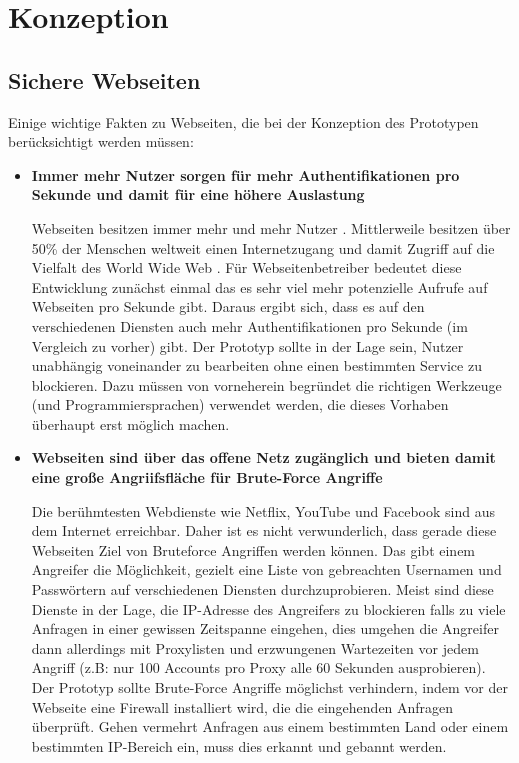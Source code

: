 \chapter{Konzeption}
\section{Sichere Webseiten}
Einige wichtige Fakten zu Webseiten, die bei der Konzeption des Prototypen berücksichtigt werden müssen:

\begin{itemize}
\item \textbf{Immer mehr Nutzer sorgen für mehr Authentifikationen pro Sekunde und damit für eine höhere Auslastung}

Webseiten besitzen immer mehr und mehr Nutzer \cite{A31}. Mittlerweile besitzen über 50\% der Menschen weltweit einen Internetzugang und damit Zugriff auf die Vielfalt des World Wide Web \cite{A30}. Für Webseitenbetreiber bedeutet diese Entwicklung zunächst einmal das es sehr viel mehr potenzielle Aufrufe auf Webseiten pro Sekunde gibt. Daraus ergibt sich, dass es auf den verschiedenen Diensten auch mehr Authentifikationen pro Sekunde (im Vergleich zu vorher) gibt. Der Prototyp sollte in der Lage sein, Nutzer unabhängig voneinander zu bearbeiten ohne einen bestimmten Service zu blockieren. Dazu müssen von vorneherein begründet die richtigen Werkzeuge (und Programmiersprachen) verwendet werden, die dieses Vorhaben überhaupt erst möglich machen.

\item \textbf{Webseiten sind über das offene Netz zugänglich und bieten damit eine große Angriifsfläche für Brute-Force Angriffe}

Die berühmtesten Webdienste wie Netflix, YouTube und Facebook sind aus dem Internet erreichbar. Daher ist es nicht verwunderlich, dass gerade diese Webseiten Ziel von Bruteforce Angriffen werden können. Das gibt einem Angreifer die Möglichkeit, gezielt eine Liste von gebreachten Usernamen und Passwörtern auf verschiedenen Diensten durchzuprobieren. Meist sind diese Dienste in der Lage, die IP-Adresse des Angreifers zu blockieren falls zu viele Anfragen in einer gewissen Zeitspanne eingehen, dies umgehen die Angreifer dann allerdings mit Proxylisten und erzwungenen Wartezeiten vor jedem Angriff (z.B: nur 100 Accounts pro Proxy alle 60 Sekunden ausprobieren). Der Prototyp sollte Brute-Force Angriffe möglichst verhindern, indem vor der Webseite eine Firewall installiert wird, die die eingehenden Anfragen überprüft. Gehen vermehrt Anfragen aus einem bestimmten Land oder einem bestimmten IP-Bereich ein, muss dies erkannt und gebannt werden.


\end{itemize}
